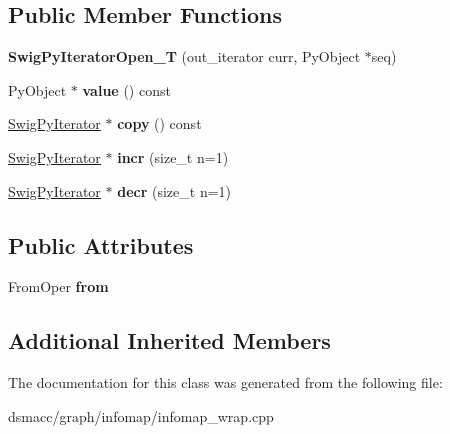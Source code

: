 \subsection*{Public Member Functions}
\begin{DoxyCompactItemize}
\item 
\mbox{\label{classswig_1_1SwigPyIteratorOpen__T_aad68570a11be76ad2e4c5abbdca54b1e}} 
{\bfseries Swig\+Py\+Iterator\+Open\+\_\+T} (out\+\_\+iterator curr, Py\+Object $\ast$seq)
\item 
\mbox{\label{classswig_1_1SwigPyIteratorOpen__T_aa219f4e29ccea747d23fdb68705a530d}} 
Py\+Object $\ast$ {\bfseries value} () const
\item 
\mbox{\label{classswig_1_1SwigPyIteratorOpen__T_a98aa48ae93af61706ec3b587d2c7dda6}} 
\mbox{\hyperlink{structswig_1_1SwigPyIterator}{Swig\+Py\+Iterator}} $\ast$ {\bfseries copy} () const
\item 
\mbox{\label{classswig_1_1SwigPyIteratorOpen__T_a6d7ddd4cc294d13214372f7619cb7ce5}} 
\mbox{\hyperlink{structswig_1_1SwigPyIterator}{Swig\+Py\+Iterator}} $\ast$ {\bfseries incr} (size\+\_\+t n=1)
\item 
\mbox{\label{classswig_1_1SwigPyIteratorOpen__T_a5e556e6e84a3684129c79d38c171e976}} 
\mbox{\hyperlink{structswig_1_1SwigPyIterator}{Swig\+Py\+Iterator}} $\ast$ {\bfseries decr} (size\+\_\+t n=1)
\end{DoxyCompactItemize}
\subsection*{Public Attributes}
\begin{DoxyCompactItemize}
\item 
\mbox{\label{classswig_1_1SwigPyIteratorOpen__T_a1fdd8b3f85a163f2c5a0aa8bf4cb996d}} 
From\+Oper {\bfseries from}
\end{DoxyCompactItemize}
\subsection*{Additional Inherited Members}


The documentation for this class was generated from the following file\+:\begin{DoxyCompactItemize}
\item 
dsmacc/graph/infomap/infomap\+\_\+wrap.\+cpp\end{DoxyCompactItemize}
